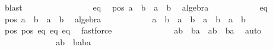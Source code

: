 \begin{isabellebody}
\ blast\isanewline
\ \ \ \ \isanewline
\ \ \ \ \ \ \ \ \ \ \isamarkupfalse%
\ eq{}\ \isamarkupfalse%
\ pos{}{\isacharcolon}\ {\isachardoublequoteopen}a{}\ {\isacharequal}\ b{}\ {\isasymor}\ a{}\ {\isacharequal}\ {\isacharminus}b{}{\isachardoublequoteclose}\ \isamarkupfalse%
\ algebra\isanewline
\ \ \ \ \ \ \ \ \ \ \isamarkupfalse%
\ eq{}\ \isamarkupfalse%
\ pos{}{\isacharcolon}\ {\isachardoublequoteopen}a{}\ {\isacharequal}\ b{}\ {\isasymor}\ a{}\ {\isacharequal}\ {\isacharminus}b{}{\isachardoublequoteclose}\ \isamarkupfalse%
\ algebra\isanewline
\ \ \ \ \ \ \ \ \ \ \isamarkupfalse%
\ {\isachardoublequoteopen}{\isacharparenleft}a{}\ {\isacharequal}\ b{}\ {\isasymand}\ a{}\ {\isacharequal}\ b{}{\isacharparenright}\ {\isasymor}\ {\isacharparenleft}a{}\ {\isacharequal}\ {\isacharminus}b{}\ {\isasymand}\ a{}\ {\isacharequal}\ {\isacharminus}b{}{\isacharparenright}{\isachardoublequoteclose}\isanewline
\ \ \ \ \ \ \ \ \ \ \ \ \isamarkupfalse%
\ pos{}\ pos{}\ eq{}\ eq{}\ eq{}{\isacharprime}\ \isamarkupfalse%
\ fastforce\ \isanewline
\ \ \ \ \ \ \ \ \ \ \isamarkupfalse%
\ \isamarkupfalse%
\ {\isachardoublequoteopen}{\isacharparenleft}a{}{\isacharcomma}b{}{\isacharparenright}\ {\isacharequal}\ {\isacharparenleft}b{}{\isacharcomma}a{}{\isacharparenright}\ {\isasymor}\ {\isacharparenleft}a{}{\isacharcomma}b{}{\isacharparenright}\ {\isacharequal}\ {\isacharparenleft}{\isacharminus}b{}{\isacharcomma}{\isacharminus}a{}{\isacharparenright}{\isachardoublequoteclose}\ \isamarkupfalse%
\ auto\ \ \ \ \ \ \ \ \isanewline
\ \ \ \ \ \ \ \ \ \ \isamarkupfalse%
\ \isamarkupfalse%
\ {\isachardoublequoteopen}{\isacharparenleft}a{}{\isacharcomma}b{}{\isacharparenright}\ {\isasymin}\ {\isacharbraceleft}{\isacharparenleft}b{}{\isacharcomma}a{}{\isacharparenright}{\isacharcomma}{\isacharparenleft}{\isacharminus}b{}{\isacharcomma}{\isacharminus}a{}{\isacharparenright}{\isacharbraceright}{\isachardoublequoteclose}\ \isamarkupfalse%

\end{isabellebody}

